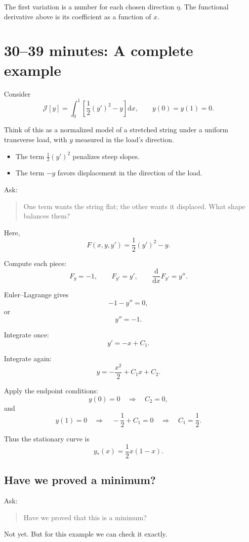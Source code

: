 \documentclass[11pt,a4paper]{article}
\newcommand{\dd}{\mathrm{d}}
\newcommand{\J}{\mathcal{J}}
\begin{document}
The first variation is a number for each chosen direction \(\eta\).
The functional derivative above is its coefficient as a function
of \(x\).

\section*{30--39 minutes: A complete example}

Consider
\[
\boxed{
\J[y]
=
\int_0^1
\left[
\frac12(y')^2-y
\right]\dd x,
\qquad
y(0)=y(1)=0.
}
\]

Think of this as a normalized model of a stretched string under
a uniform transverse load, with \(y\) measured in the load's direction.

\begin{itemize}
\item The term \(\tfrac12(y')^2\) penalizes steep slopes.
\item The term \(-y\) favors displacement in the direction of the load.
\end{itemize}

Ask:
\begin{quote}
One term wants the string flat; the other wants it displaced.
What shape balances them?
\end{quote}

Here,
\[
F(x,y,y')=\frac12(y')^2-y.
\]

Compute each piece:
\[
F_y=-1,
\qquad
F_{y'}=y',
\qquad
\frac{\dd}{\dd x}F_{y'}=y''.
\]

Euler--Lagrange gives
\[
-1-y''=0,
\]
or
\[
y''=-1.
\]

Integrate once:
\[
y'=-x+C_1.
\]

Integrate again:
\[
y=-\frac{x^2}{2}+C_1x+C_2.
\]

Apply the endpoint conditions:
\[
y(0)=0
\quad\Longrightarrow\quad
C_2=0,
\]
and
\[
y(1)=0
\quad\Longrightarrow\quad
-\frac12+C_1=0
\quad\Longrightarrow\quad
C_1=\frac12.
\]

Thus the stationary curve is
\[
\boxed{
y_*(x)=\frac12x(1-x).
}
\]

\subsection*{Have we proved a minimum?}

Ask:
\begin{quote}
Have we proved that this is a minimum?
\end{quote}

Not yet. But for this example we can check it exactly.
\end{document}
